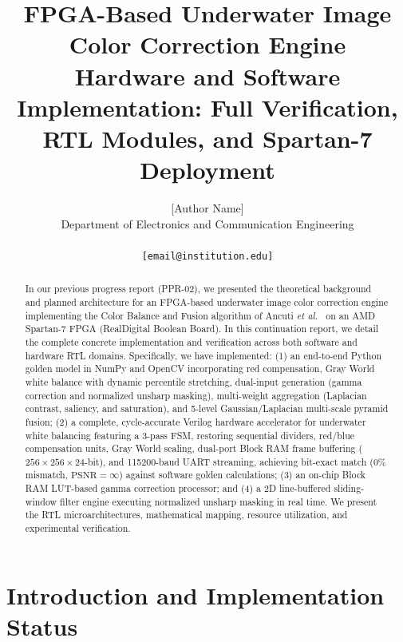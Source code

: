 \documentclass[10pt,twocolumn,letterpaper]{article}
\begin{document}
\title{FPGA-Based Underwater Image Color Correction Engine\\
\large{Hardware and Software Implementation: Full Verification, RTL Modules, and Spartan-7 Deployment}}

\author{
  [Author Name]\\
  Department of Electronics and Communication Engineering\\
  [Institution Name]\\
  {\tt\small [email@institution.edu]}
}
\maketitle

\begin{abstract}
  In our previous progress report (PPR-02), we presented the theoretical background and planned architecture for an FPGA-based underwater image color correction engine implementing the Color Balance and Fusion algorithm of Ancuti \emph{et al.}~\cite{ancuti2018color} on an AMD Spartan-7 FPGA (RealDigital Boolean Board). In this continuation report, we detail the complete concrete implementation and verification across both software and hardware RTL domains. Specifically, we have implemented: (1) an end-to-end Python golden model in NumPy and OpenCV incorporating red compensation, Gray World white balance with dynamic percentile stretching, dual-input generation (gamma correction and normalized unsharp masking), multi-weight aggregation (Laplacian contrast, saliency, and saturation), and 5-level Gaussian/Laplacian multi-scale pyramid fusion; (2) a complete, cycle-accurate Verilog hardware accelerator for underwater white balancing featuring a 3-pass FSM, restoring sequential dividers, red/blue compensation units, Gray World scaling, dual-port Block RAM frame buffering ($256\times256\times24$-bit), and 115200-baud UART streaming, achieving bit-exact match ($0\%$ mismatch, $\text{PSNR}=\infty$) against software golden calculations; (3) an on-chip Block RAM LUT-based gamma correction processor; and (4) a 2D line-buffered sliding-window filter engine executing normalized unsharp masking in real time. We present the RTL microarchitectures, mathematical mapping, resource utilization, and experimental verification.
\end{abstract}

\section{Introduction and Implementation Status}
\label{sec:intro}
\end{document}
